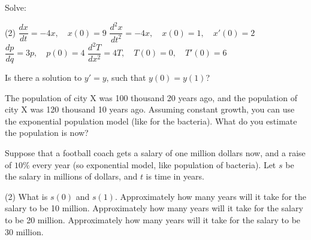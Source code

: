 \documentclass{ximera}
\begin{document}
\begin{exercise}%
    Solve:
    \begin{tasks}(2)
        \task $\dfrac{dx}{dt} = -4x, \quad x(0)=9$
        \task $\dfrac{d^2x}{dt^2} = -4x, \quad x(0)=1, \quad x'(0)=2$
        \task $\dfrac{dp}{dq} = 3 p, \quad p(0)=4$
        \task $\dfrac{d^2T}{dx^2} = 4 T, \quad T(0)=0, \quad T'(0)=6$
    \end{tasks}
\end{exercise}

\begin{exercise}
    Is there a solution to $y' = y$, such that $y(0) = y(1)$?
\end{exercise}

\begin{exercise}
    The population of city X was 100 thousand 20 years ago, and the population of city X was 120 thousand 10 years ago.  Assuming constant growth, you can use the exponential population model (like for the bacteria).  What do you estimate the population is now?
\end{exercise}

\begin{exercise}
    Suppose that a football coach gets a salary of one million dollars now, and a raise of $10\%$ every year (so exponential model, like population of bacteria). Let $s$ be the salary in millions of dollars, and $t$ is time in years.
    \begin{tasks}(2)
        \task What is $s(0)$ and $s(1)$.
        \task Approximately how many years will it take for the salary to be 10 million.
        \task Approximately how many years will it take for the salary to be 20 million.
        \task Approximately how many years will it take for the salary to be 30 million.
    \end{tasks}
\end{exercise}

\end{document}
